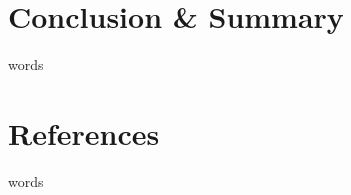 \documentclass[fleqn,12pt]{SelfArx} %
\begin{document}
\section{Conclusion \& Summary}
words

\section{References}
words




\end{document}
